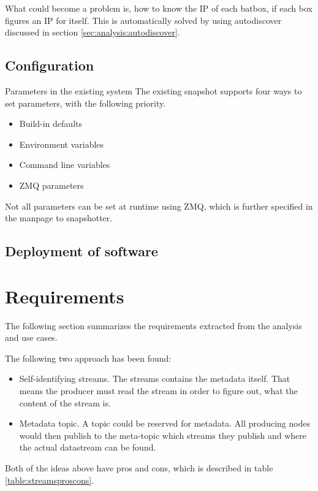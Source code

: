 What could become a problem is, how to know the IP of each batbox, if each box figures an IP for itself. This is automatically solved by using autodiscover discussed in section \ref{sec:analysis:autodiscover}.

\subsection{Configuration}
Parameters in the existing system
The existing snapshot supports four ways to set parameters, with the following priority.
\begin{itemize}
	\item Build-in defaults
	\item Environment variables
	\item Command line variables
	\item ZMQ parameters
\end{itemize}

Not all parameters can be set at runtime using ZMQ, which is further specified in the manpage to snapshotter.


\subsection{Deployment of software}

\section{Requirements}
The following section summarizes the requirements extracted from the analysis and use cases.


The following two approach has been found:
\begin{itemize}
	\item Self-identifying streams. The streams contains the metadata itself. That means the producer must read the stream in order to figure out, what the content of the stream is.
	\item Metadata topic. A topic could be reserved for metadata. All producing nodes would then publish to the meta-topic which streams they publish and where the actual datastream can be found.
\end{itemize}
Both of the ideas above have pros and cons, which is described in table \ref{table:streamsproscons}.


